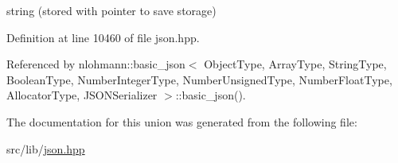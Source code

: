 string (stored with pointer to save storage) 



Definition at line 10460 of file json.\+hpp.



Referenced by nlohmann\+::basic\+\_\+json$<$ Object\+Type, Array\+Type, String\+Type, Boolean\+Type, Number\+Integer\+Type, Number\+Unsigned\+Type, Number\+Float\+Type, Allocator\+Type, J\+S\+O\+N\+Serializer $>$\+::basic\+\_\+json().



The documentation for this union was generated from the following file\+:\begin{DoxyCompactItemize}
\item 
src/lib/\hyperlink{json_8hpp}{json.\+hpp}\end{DoxyCompactItemize}
